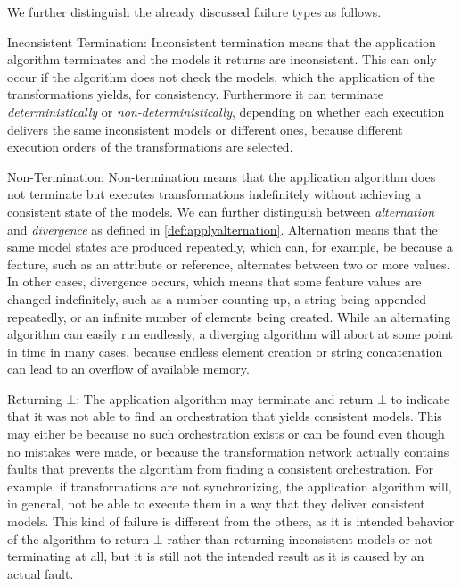 We further distinguish the already discussed failure types as follows.
\begin{properdescription}
    \item[Inconsistent Termination:] %
    Inconsistent termination means that the application algorithm terminates and the models it returns are inconsistent.
    This can only occur if the algorithm does not check the models, which the application of the transformations yields, for consistency.
    Furthermore it can terminate \emph{deterministically} or \emph{non-deterministically}, depending on whether each execution delivers the same inconsistent models or different ones, because different execution orders of the transformations are selected.

    \item[Non-Termination:] %
    Non-termination means that the application algorithm does not terminate but executes transformations indefinitely without achieving a consistent state of the models.
    We can further distinguish between \emph{alternation} and \emph{divergence} as defined in \autoref{def:applyalternation}.
    Alternation means that the same model states are produced repeatedly, which can, for example, be because a feature, such as an attribute or reference, alternates between two or more values.
    In other cases, divergence occurs, which means that some feature values are changed indefinitely, such as a number counting up, a string being appended repeatedly, or an infinite number of elements being created.
    While an alternating algorithm can easily run endlessly, a diverging algorithm will abort at some point in time in many cases, because endless element creation or string concatenation can lead to an overflow of available memory.
    
    \item[Returning $\bot$:] %
    The application algorithm may terminate and return $\bot$ to indicate that it was not able to find an orchestration that yields consistent models.
    This may either be because no such orchestration exists or can be found even though no mistakes were made, or because the transformation network actually contains faults that prevents the algorithm from finding a consistent orchestration.
    For example, if transformations are not synchronizing, the application algorithm will, in general, not be able to execute them in a way that they deliver consistent models.
    This kind of failure is different from the others, as it is intended behavior of the algorithm to return $\bot$ rather than returning inconsistent models or not terminating at all, but it is still not the intended result as it is caused by an actual fault.


\end{properdescription}
